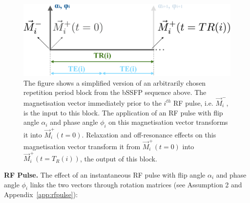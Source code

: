 \begin{figure}[ht]
    \centering
    \includegraphics[angle=0,width=1\textwidth, keepaspectratio]{images/mrf/sequencebSSFPOneBlock}
    \caption{The figure shows a simplified version of an arbitrarily chosen repetition period block from the bSSFP sequence above.
    The magnetisation vector immediately prior to the $i^{th}$ RF pulse, i.e. $\vec{M}^-_i$, is the input to this block.
    The application of an RF pulse with flip angle $\alpha_i$ and phase angle $\phi_i$ on this magnetisation vector transforms it into $\vec{M}^+_i(t=0)$.
    Relaxation and off-resonance effects on this magnetisation vector transform it from $\vec{M}^+_i(t=0)$ into $\vec{M}^+_i(t=T_R(i))$, the output of this block.
    }
    \label{fig:sequencebSSFPOneBlock}
\end{figure}

\textbf{RF Pulse.} 
The effect of an instantaneous RF pulse with flip angle $\alpha_i$ and phase angle $\phi_i$ links the two vectors through rotation matrices (see Assumption 2 and Appendix~\ref{app:rfpulse}):

